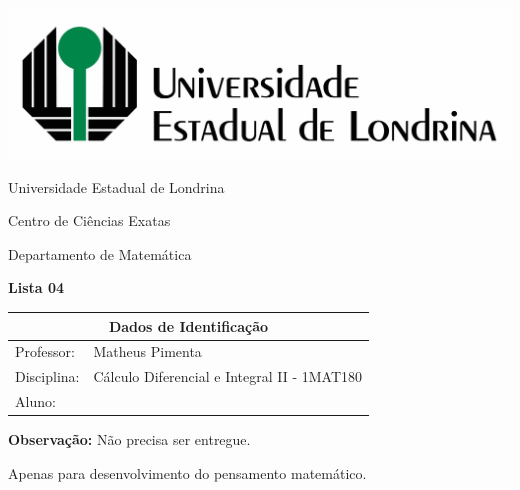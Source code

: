 \documentclass[oneside,a4paper,12pt]{article}
\newcommand{\universidade}{Universidade Estadual de Londrina}
\newcommand{\centro}{Centro de Ciências Exatas}
\newcommand{\departamento}{Departamento de Matemática}
\newcommand{\curso}{Ciência da Computação}
\newcommand{\professores}{Matheus Pimenta}
\newcommand{\disciplina}{Cálculo Diferencial e Integral II - 1MAT180}
\begin{document}
	\pagestyle{empty}
	
	\begin{center}
		\includegraphics[width=\linewidth/2]{logo.jpg}%
	 	\vspace{2pt} 	
		
		\universidade
		\par
		\centro
		\par
		\departamento
		\par
		\par
		\vspace{12pt}
		\LARGE \textbf{Lista 04}
		
	\end{center}
	
	\vspace{12pt}
	
	\begin{tabular}{ |l|p{12cm}| }
		
		\hline
		\multicolumn{2}{|c|}{\textbf{Dados de Identificação}} \\
		\hline
		Professor:         &    \professores           \\
		\hline
		Disciplina:        &    \disciplina          \\
		\hline
		Aluno:             &                   \\
		\hline
		
	\end{tabular}
	\vspace{6pt}
	
	{\bf Observação:} Não precisa ser entregue. 
	
	Apenas para desenvolvimento do pensamento matemático.
	
	\begin{snugshade}
	\end{snugshade}
\end{document}
